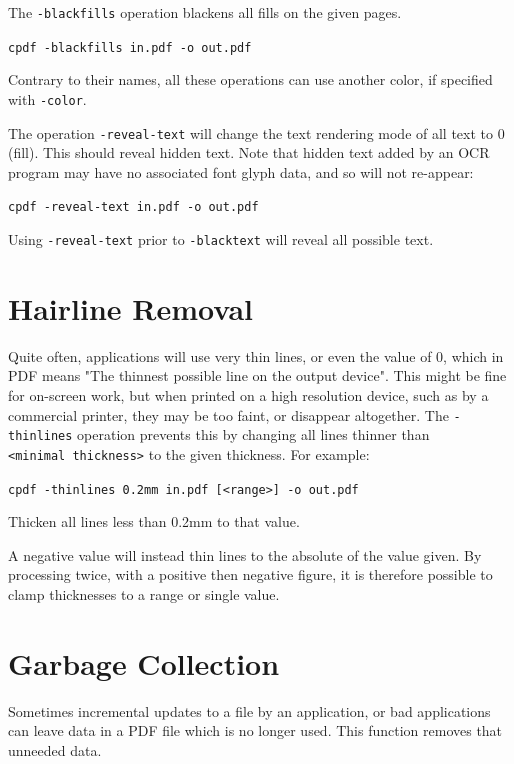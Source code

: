 \documentclass{book}
\begin{document}
\noindent The \texttt{-blackfills} operation blackens all fills on the given pages.

  \begin{framed}
    \noindent\small\verb!cpdf -blackfills in.pdf -o out.pdf!
  \end{framed}

\noindent Contrary to their names, all these operations can use another color, if specified with \texttt{-color}.

The operation \texttt{-reveal-text} will change the text rendering mode of all text to 0 (fill). This should reveal hidden text. Note that hidden text added by an OCR program may have no associated font glyph data, and so will not re-appear:

  \begin{framed}
    \noindent\small\verb!cpdf -reveal-text in.pdf -o out.pdf!
  \end{framed}

\noindent Using \texttt{-reveal-text} prior to \texttt{-blacktext} will reveal all possible text.

  \section{Hairline Removal}
  Quite often, applications will use very thin lines, or even the value of 0,
which in PDF means "The thinnest possible line on the output device". This
might be fine for on-screen work, but when printed on a high resolution device,
such as by a commercial printer, they may be too faint, or disappear
altogether. The \texttt{-thinlines} operation prevents this by changing all lines
thinner than \texttt{<minimal~thickness>} to the given thickness. For example:

  \begin{framed}
  \small\noindent\verb!cpdf -thinlines 0.2mm in.pdf [<range>] -o out.pdf!

  \vspace{2.5mm}
  \noindent Thicken all lines less than 0.2mm to that value.
  \end{framed} 

  \noindent A negative value will instead thin lines to the absolute of the value given. By processing twice, with a positive then negative figure, it is therefore possible to clamp thicknesses to a range or single value.

  \section{Garbage Collection}
  Sometimes incremental updates to a file by an application, or bad
applications can leave data in a PDF file which is no longer used. This
function removes that unneeded data.
\end{document}
